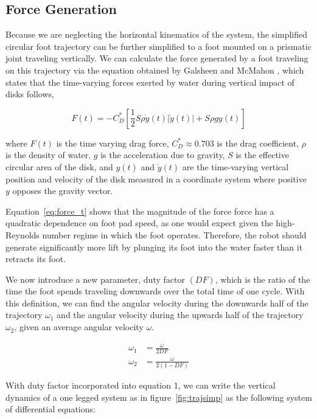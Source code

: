 \subsection{Force Generation}
Because we are neglecting the horizontal kinematics of the system, the simplified circular foot trajectory can be further simplified to a foot mounted on a prismatic joint traveling vertically. We can calculate the force generated by a foot traveling on this trajectory via the equation obtained by Galsheen and McMahon \cite{glasheen1996vertical}, which states that the time-varying forces exerted by water during vertical impact of disks follows,

\begin{equation}
	F(t) = - C_D^* \left[\frac{1}{2} S \rho \dot{y}(t) |\dot{y}(t) | + S \rho g y(t) \right]
	\label{eq:force_t}
\end{equation}

\noindent where $F(t)$ is the time varying drag force, $C_D^* \approx 0.703$ is the drag coefficient, $\rho$ is the density of water, $g$ is the acceleration due to gravity, $S$ is the effective circular area of the disk, and $y(t)$ and $\dot{y}(t)$ are the time-varying vertical position and velocity of the disk measured in a coordinate system where positive $y$ opposes the gravity vector. 

Equation~\ref{eq:force_t} shows that the magnitude of the force force has a quadratic dependence on foot pad speed, as one would expect given the high-Reynolds number regime in which the foot operates. Therefore, the robot should generate significantly more lift by plunging its foot into the water faster than it retracts its foot.

We now introduce a new parameter, duty factor $(DF)$, which is the ratio of the time the foot spends traveling downwards over the total time of one cycle. With this definition, we can find the angular velocity during the downwards half of the trajectory $\omega_1$ and the angular velocity during the upwards half of the trajectory $\omega_2$, given an average angular velocity $\omega$.

\begin{align}
	\omega_1 &= \frac{\omega}{2 DF} \\
	\omega_2 &= \frac{\omega}{2 (1 - DF)} 
\end{align}

With duty factor incorporated into equation 1, we can write the vertical dynamics of a one legged system as in figure~\ref{fig:trajsimp} as the following system of differential equations:

